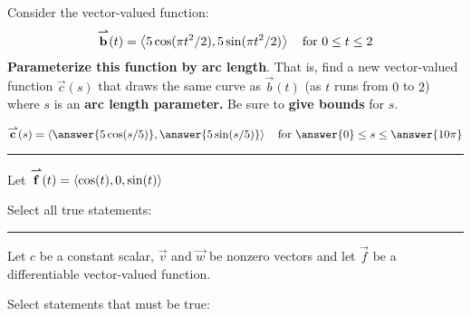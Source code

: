 \documentclass{ximera}
\author{Bart Snapp}
\begin{document}
\begin{problem}%
Consider the vector-valued function:
\[
{\overset{\boldsymbol{\rightharpoonup}}{\mathbf{b}}}(t) = \left\langle 5\cos(\pi t^2/2),5\sin(\pi t^2/2)\right\rangle \quad\text{for }0\le t\le 2
\]
\textbf{Parameterize this function by arc length}. That is, find a new
vector-valued function $\vec{c}(s)$ that draws the same curve as
$\vec{b}(t)$ (as $t$ runs from $0$ to $2$) where $s$ is an \textbf{arc length
parameter.} Be sure to \textbf{give bounds} for $s$.

\begin{prompt}
  \[
  \vec{c}(s) = \vector{\answer{5\cos(s/5)},\answer{5\sin(s/5)}} \quad\text{for~}\answer{0}\le s\le \answer{10\pi}
  \]
\end{prompt}


\vspace{2.75in}

\end{problem}

\hrule

\begin{problem}
  Let ${\overset{\boldsymbol{\rightharpoonup}}{\mathbf{f}}}(t) = \left\langle \cos(t),0,\sin(t)\right\rangle$
  \begin{prompt}
    Select all true statements:
  \end{prompt}
  \begin{selectAll}
  \end{selectAll}

  \end{problem}


\hrule

\begin{problem}
  Let $c$ be a constant scalar, $\vec{v}$ and $\vec{w}$ be nonzero
  vectors and let $\vec{f}$ be a differentiable vector-valued
  function.
  \begin{prompt}
    Select statements that must be true:
  \end{prompt}
  \begin{selectAll}
  \end{selectAll}
\end{problem}
\end{document}
